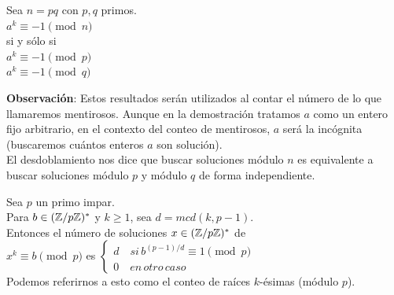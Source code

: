 \begin{enunciado} \label{enun:desdoblar2}\leavevmode\par 
Sea $n=pq$ con $p,q$ primos. \\
$a^k \equiv -1 \pmod n$ \\
si y sólo si \\
$a^k \equiv -1 \pmod p$ \\
$a^k \equiv -1 \pmod q$
\end{enunciado}

\textbf{Observación}: Estos resultados serán utilizados al contar el número de lo que llamaremos mentirosos. Aunque en la demostración tratamos $a$ como un entero fijo arbitrario, en el contexto del conteo de mentirosos, $a$ será la incógnita (buscaremos cuántos enteros $a$ son solución). \\
El desdoblamiento nos dice que buscar soluciones módulo $n$ es equivalente a buscar soluciones módulo $p$ y módulo $q$ de forma independiente.

\begin{enunciado} \label{enun:numsol}\leavevmode\par 
Sea $p$ un primo impar. \\
Para $b \in (\mathbb{Z}/p\mathbb{Z})^*$ y $k\ge1$, sea $d=mcd(k,p-1)$. \\
Entonces el número de soluciones $x\in(\mathbb{Z}/p\mathbb{Z})^*$ de \\
$x^k \equiv b\pmod p$ es 
$\begin{cases} 
d  \quad si \, b^{(p-1)/d} \equiv 1 \pmod p \\ 
0  \quad en \, otro \, caso 
\end{cases}$ \\
Podemos referirnos a esto como el conteo de raíces $k$-ésimas (módulo $p$).
\end{enunciado}

